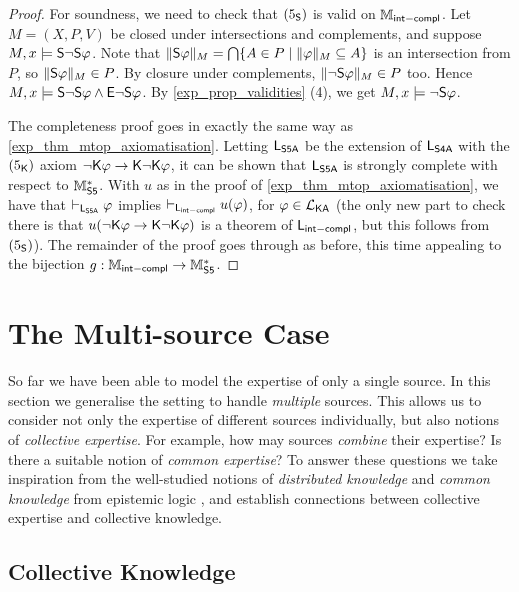 \begin{proof}
    For soundness, we need to check that $\fivesoundness$ is valid on
    $\Mintcompl$. Let $M = (X, P, V)$ be closed under intersections and
    complements, and suppose $M, x \models \S\neg\S\phi$. Note that
    $\|\S\phi\|_M = \bigcap\{A \in P \mid \|\phi\|_M \subseteq A\}$ is an
    intersection from $P$, so $\|\S\phi\|_M \in P$. By closure under
    complements, $\|\neg\S\phi\|_M \in P$ too. Hence $M, x \models \S\neg\S\phi
    \land \E\neg\S\phi$. By \cref{exp_prop_validities} (4), we get $M, x \models
    \neg\S\phi$.

    The completeness proof goes in exactly the same way as
    \cref{exp_thm_mtop_axiomatisation}. Letting $\sLsfivea$ be the extension of
    $\sLsfoura$ with the $\fivek$ axiom $\neg\K\phi \limplies \K\neg\K\phi$, it
    can be shown that $\sLsfivea$ is strongly complete with respect to
    $\Msfive$.  With $u$ as in the proof of \cref{exp_thm_mtop_axiomatisation}, we
    have that $\entails_{\sLsfivea} \phi$ implies $\entails_{\sLintcompl}
    u(\phi)$, for $\phi \in \cLKA$ (the only new part to check there is that
    $u(\neg\K\phi \limplies \K\neg\K\phi)$ is a theorem of $\sLintcompl$, but
    this follows from $\fivesoundness$). The remainder of the proof goes
    through as before, this time appealing to the bijection $g: \Mintcompl \to
    \Msfive$.
\end{proof}

\section{The Multi-source Case}
\label{exp_sec_multisource}

So far we have been able to model the expertise of only a single
source. In this section we generalise the setting to handle \emph{multiple}
sources. This allows us to consider not only the expertise of different
sources individually, but also notions of \emph{collective expertise}. For
example, how may sources \emph{combine} their expertise? Is there a suitable
notion of
\emph{common expertise}? To answer these questions we take inspiration from the
well-studied notions of \emph{distributed knowledge} and \emph{common
knowledge} from epistemic logic \cite{fagin2003reasoning}, and
establish connections between collective expertise and collective knowledge.

\subsection{Collective Knowledge}

